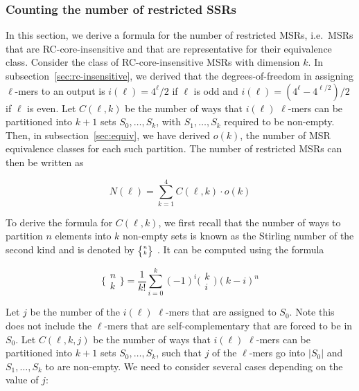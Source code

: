 \documentclass[
  11pt,
  twoside]{scrbook}
\begin{document}
\hypertarget{counting-the-number-of-restricted-ssrs}{%
\subsubsection{Counting the number of restricted SSRs}\label{counting-the-number-of-restricted-ssrs}}

In this section, we derive a formula for the number of restricted MSRs,
i.e.~MSRs that are RC-core-insensitive and that are representative for
their equivalence class. Consider the class of RC-core-insensitive MSRs
with dimension \(k\). In
subsection~\ref{sec:rc-insensitive}, we derived that the degrees-of-freedom
in assigning \(\ell\)-mers to an output is \(i(\ell) = 4^\ell/2\) if \(\ell\)
is odd and \(i(\ell) = (4^\ell - 4^{\ell / 2})/2\) if \(\ell\) is even. Let
\(C(\ell,k)\) be the number of ways that \(i(\ell)\) \(\ell\)-mers can be
partitioned into \(k+1\) sets \(S_0, \ldots, S_k\), with \(S_1, \ldots, S_k\)
required to be non-empty. Then, in
subsection~\ref{sec:equiv}, we have derived \(o(k)\), the number of MSR
equivalence classes for each such partition. The number of restricted
MSRs can then be written as

\begin{equation}
N(\ell) = \sum_{k=1}^{4} C(\ell, k) \cdot o(k)
\label{eq:N}
\end{equation}

To derive the formula for \(C(\ell, k)\), we first recall that the number
of ways to partition \(n\) elements into \(k\) non-empty sets is known as
the Stirling number of the second kind and is denoted by
\(\tiny\bigg\{%
\begin{matrix}
    n \\
    k
\end{matrix}
\bigg\} \) \autocite[ p.265]{grahamConcreteMathematicsFoundation1994}. It can
be computed using the formula

\begin{equation*}
    \bigg\{%
\begin{matrix}
    n \\
    k
\end{matrix}
\bigg\}  = \frac{1}{k!}\sum_{i=0}^k(-1)^i\bigg(
\begin{matrix}
    k \\
    i
\end{matrix}
\bigg) (k-i)^n
\end{equation*}

Let \(j\) be the number of the \(i(\ell)\) \(\ell\)-mers that are assigned to
\(S_0\). Note this does not include the \(\ell\)-mers that are
self-complementary that are forced to be in \(S_0\). Let \(C(\ell,k,j)\) be
the number of ways that \(i(\ell)\) \(\ell\)-mers can be partitioned into
\(k+1\) sets \(S_0, \ldots, S_k\), such that \(j\) of the \(\ell\)-mers go into
\(|S_0|\) and \(S_1, \ldots, S_k\) to are non-empty. We need to consider
several cases depending on the value of \(j\):
\end{document}
